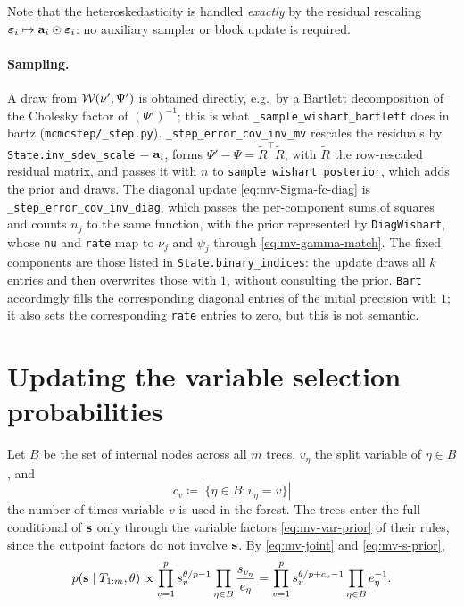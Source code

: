 Note that the heteroskedasticity is handled \emph{exactly} by the residual
rescaling $\bm{\varepsilon}_i \mapsto \mathbf{a}_i \odot \bm{\varepsilon}_i$: no auxiliary
sampler or block update is required.

\paragraph{Sampling.} A draw from $\mathcal{W}(\nu', \Psi')$ is obtained directly,
e.g.\ by a Bartlett decomposition of the Cholesky factor of $(\Psi')^{-1}$;
this is what \texttt{\_sample\_wishart\_bartlett} does in bartz
(\texttt{mcmcstep/\_step.py}). \texttt{\_step\_error\_cov\_inv\_mv} rescales
the residuals by \texttt{State.inv\_sdev\_scale} $= \mathbf{a}_i$, forms
$\Psi' - \Psi = \tilde R^\top \tilde R$, with $\tilde R$ the row-rescaled
residual matrix, and passes it with $n$ to
\texttt{sample\_wishart\_posterior}, which adds the prior and draws. The
diagonal update \eqref{eq:mv-Sigma-fc-diag} is
\texttt{\_step\_error\_cov\_inv\_diag}, which passes the per-component sums
of squares and counts $n_j$ to the same function, with the prior
represented by \texttt{DiagWishart}, whose \texttt{nu} and
\texttt{rate} map to $\nu_j$ and $\psi_j$ through
\eqref{eq:mv-gamma-match}. The fixed components are those listed in
\texttt{State.binary\_indices}: the update draws all $k$ entries and then
overwrites those with $1$, without consulting the prior. \texttt{Bart}
accordingly fills the corresponding diagonal entries
of the initial precision with $1$; it also sets the corresponding \texttt{rate} entries to zero,
but this is not semantic.

\section{Updating the variable selection probabilities}
\label{sec:mv-sparse}

Let $B$ be the set of internal nodes across all $m$ trees, $v_\eta$ the
split variable of $\eta \in B$, and
\begin{equation}
	\label{eq:mv-varcount}
	c_v \coloneqq |\{\eta \in B : v_\eta = v\}|
\end{equation}
the number of times variable $v$ is used in the forest. The trees enter the
full conditional of $\mathbf{s}$ only through the variable factors
\eqref{eq:mv-var-prior} of their rules, since the cutpoint factors do not
involve $\mathbf{s}$. By \eqref{eq:mv-joint} and \eqref{eq:mv-s-prior},
\begin{equation}
	\label{eq:mv-s-fc}
	p(\mathbf{s} \mid T_{1:m}, \theta)
	\propto \prod_{v=1}^p s_v^{\theta/p - 1}
	\prod_{\eta \in B} \frac{s_{v_\eta}}{e_\eta}
	= \prod_{v=1}^p s_v^{\theta/p + c_v - 1}
	\prod_{\eta \in B} e_\eta^{-1}.
\end{equation}

